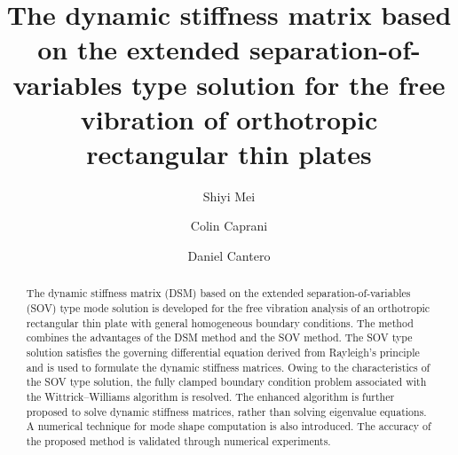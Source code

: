 \documentclass[preprint,12pt]{elsarticle}
\begin{document}
\begin{frontmatter}
\title{The dynamic stiffness matrix based on the extended separation-of-variables type solution for the free vibration of orthotropic rectangular thin plates}
\author[1]{Shiyi Mei}
\author[1]{Colin Caprani}
\author[2]{Daniel Cantero}
\begin{abstract}
The dynamic stiffness matrix (DSM) based on the extended separation-of-variables (SOV) type mode solution is developed for the free vibration analysis of an orthotropic rectangular thin plate with general homogeneous boundary conditions.  
The method combines the advantages of the DSM method and the SOV method.
The SOV type solution satisfies the governing differential equation derived from Rayleigh’s principle and is used to formulate the dynamic stiffness matrices.
Owing to the characteristics of the SOV type solution, the fully clamped boundary condition problem associated with the Wittrick–Williams algorithm is resolved. 
The enhanced algorithm is further proposed to solve dynamic stiffness matrices, rather than solving eigenvalue equations.
A numerical technique for mode shape computation is also introduced.
The accuracy of the proposed method is validated through numerical experiments.
  
\end{abstract}
\end{frontmatter}
\linenumbers
\end{document}
